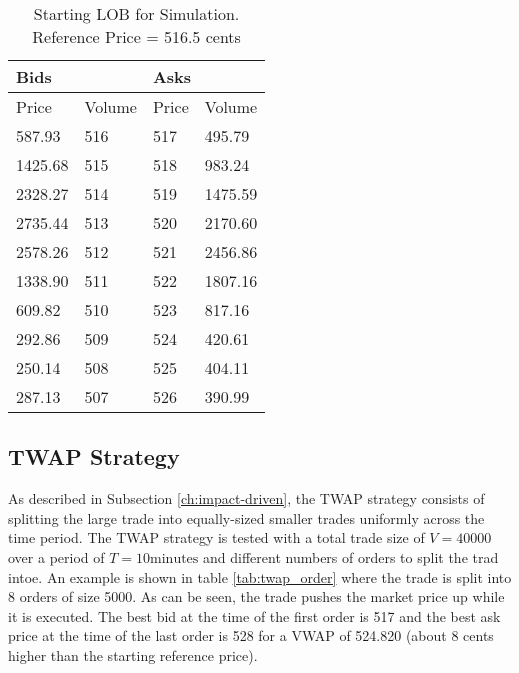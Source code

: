 \begin{table}[htbp]
\caption{Starting LOB for Simulation. Reference Price = 516.5 cents} \label{tab:starting_LOB}
\begin{center}
\begin{tabular}{ll|ll}
\hline \hline
\multicolumn{2}{l|}{\textbf{Bids}} & \multicolumn{2}{l}{\textbf{Asks}} \\
\hline
Price        & Volume    & Price      & Volume      \\
\hline
587.93       & 516       & 517        & 495.79      \\
1425.68      & 515       & 518        & 983.24      \\
2328.27      & 514       & 519        & 1475.59     \\
2735.44      & 513       & 520        & 2170.60     \\
2578.26      & 512       & 521        & 2456.86     \\
1338.90      & 511       & 522        & 1807.16     \\
609.82       & 510       & 523        & 817.16      \\
292.86       & 509       & 524        & 420.61      \\
250.14       & 508       & 525        & 404.11      \\
287.13       & 507       & 526        & 390.99             
\end{tabular}
\end{center}
\end{table}

\subsection{TWAP Strategy}
As described in Subsection \ref{ch:impact-driven}, the TWAP strategy consists of splitting the large trade into equally-sized smaller trades uniformly across the time period. The TWAP strategy is tested with a total trade size of $V = 40000$ over a period of $T = 10 \text{minutes}$ and different numbers of orders to split the trad intoe.  An example is shown in table \ref{tab:twap_order} where the trade is split into 8 orders of size 5000. As can be seen, the trade pushes the market price up while it is executed. The best bid at the time of the first order is 517 and the best ask price at the time of the last order is 528 for a VWAP of 524.820 (about 8 cents higher than the starting reference price).

